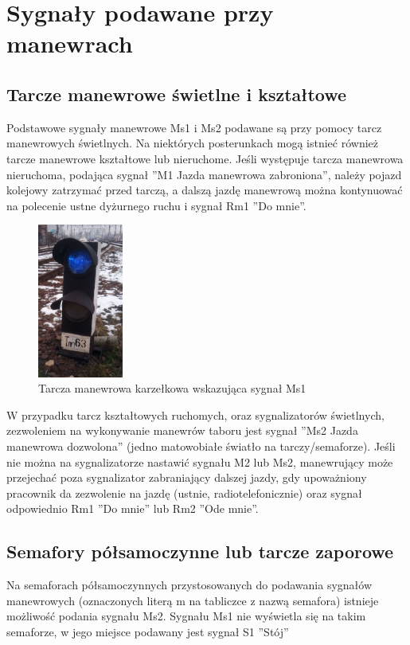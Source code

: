\chapter{Sygnały podawane przy manewrach}

\section{Tarcze manewrowe świetlne i kształtowe}
Podstawowe sygnały manewrowe Ms1 i Ms2 podawane są przy pomocy tarcz manewrowych świetlnych. Na niektórych posterunkach mogą istnieć również tarcze manewrowe kształtowe lub nieruchome. Jeśli występuje tarcza manewrowa nieruchoma, podająca sygnał ''M1 Jazda manewrowa zabroniona'', należy pojazd kolejowy zatrzymać przed tarczą, a dalszą jazdę manewrową można kontynuować na polecenie ustne dyżurnego ruchu i sygnał Rm1 ''Do mnie''.
\begin{figure}
	\includegraphics[width=0.25\textwidth]{skryptkierownik-img/tarcza-manewrowa-ms1.jpg}
	\caption{Tarcza manewrowa karzełkowa wskazująca sygnał Ms1}
\end{figure}
 W przypadku tarcz kształtowych ruchomych, oraz sygnalizatorów świetlnych, zezwoleniem na wykonywanie manewrów taboru jest sygnał ''Ms2 Jazda manewrowa dozwolona'' (jedno matowobiałe światło na tarczy/semaforze). Jeśli nie można na sygnalizatorze nastawić sygnału M2 lub Ms2, manewrujący może przejechać poza sygnalizator zabraniający dalszej jazdy, gdy upoważniony pracownik da zezwolenie na jazdę (ustnie, radiotelefonicznie) oraz sygnał odpowiednio Rm1 ''Do mnie'' lub Rm2 ''Ode mnie''.

\section{Semafory półsamoczynne lub tarcze zaporowe}
Na semaforach półsamoczynnych przystosowanych do podawania sygnałów manewrowych (oznaczonych literą m na tabliczce z nazwą semafora) istnieje możliwość podania sygnału Ms2. Sygnału Ms1 nie wyświetla się na takim semaforze, w jego miejsce podawany jest sygnał S1 ''Stój''

